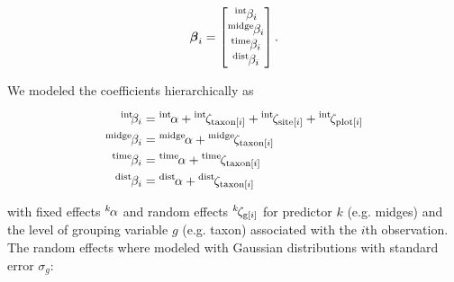 \begin{equation} \label{eq:beta-vec}
{\boldsymbol\beta}_i = \begin{bmatrix}
    {}^\text{int}\hspace*{-1pt}\beta_i \\
    {}^\text{midge}\hspace*{-1pt}\beta_i \\
    {}^\text{time}\hspace*{-1pt}\beta_i \\
    {}^\text{dist}\hspace*{-1pt}\beta_i
    \end{bmatrix}\text{.}
\end{equation}

\noindent We modeled the coefficients hierarchically \citep[following][]{Jackson2012} as

\begin{equation} \label{eq:betas}
\begin{split}
    {}^\text{int}\hspace*{-2pt}\beta_i &= {}^\text{int}\hspace*{-1pt}\alpha +
        {}^\text{int}\hspace*{-1pt}\zeta_{\text{taxon}[i]} +
        {}^\text{int}\hspace*{-1pt}\zeta_{\text{site}[i]} +
        {}^\text{int}\hspace*{-1pt}\zeta_{\text{plot}[i]} \\
    {}^\text{midge}\hspace*{-1pt}\beta_i &= {}^\text{midge}\hspace*{-1pt}\alpha +
            {}^\text{midge}\hspace*{-1pt}\zeta_{\text{taxon}[i]} \\
    {}^\text{time}\hspace*{-1pt}\beta_i &= {}^\text{time}\hspace*{-1pt}\alpha +
            {}^\text{time}\hspace*{-1pt}\zeta_{\text{taxon}[i]} \\
    {}^\text{dist}\hspace*{-1pt}\beta_i &= {}^\text{dist}\hspace*{-1pt}\alpha +
            {}^\text{dist}\hspace*{-1pt}\zeta_{\text{taxon}[i]}
\end{split}
\end{equation}

\noindent with fixed effects ${}^k\hspace*{-1pt}\alpha$ and random effects
${}^k\hspace*{-1pt}\zeta_{\text{g}[i]}$ for predictor $k$ (e.g. midges)
and the level of grouping variable $g$ (e.g. taxon) associated  with the $i$th observation.
The random effects where modeled with Gaussian distributions with
standard error $\sigma_g$:

